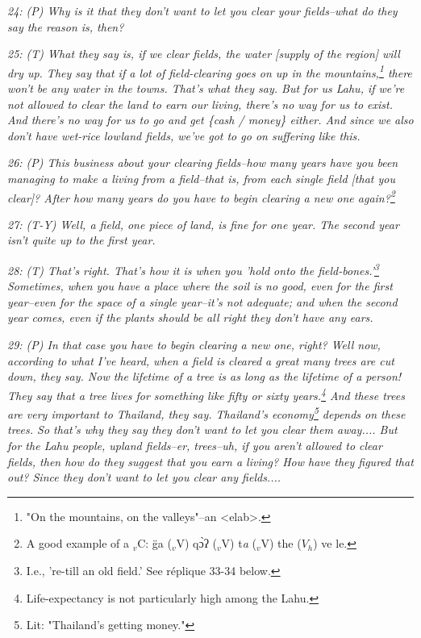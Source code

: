 \textit{24: (P) Why is it that they don't want to let you clear your fields--what
do they say the reason is, then?}

\textit{25: (T) What they say is, if we clear fields, the water [supply of the
region] will dry up. They say that if a lot of field-clearing goes on up in the
mountains,\footnote{"On the mountains, on the valleys"--an <elab>.} there won't be any water in the towns. That's what they say. But
for us Lahu, if we're not allowed to clear the land to earn our living, there's
no way for us to exist. And there's no way for us to go and get \{cash / money\}
either. And since we also don't have wet-rice lowland fields, we've got to go on
suffering like this. }

\textit{26: (P) This business about your clearing fields--how many years have you
been managing to make a living from a field--that is, from each single field [that
you clear]? After how many years do you have to begin clearing a new one again?\footnote{A good example of a $_{v}$C: g̈a ($_{v}$V) qɔ̀ʔ ($_{v}$V) t\emph{a} ($_{v}$V) the ($V_h$) ve le.}}

\textit{27: (T-Y) Well, a field, one piece of land, is fine for one year. The second
year isn't quite up to the first year. }

\textit{28: (T) That's right. That's how it is when you 'hold onto the field-bones.'\footnote{I.e., 're-till an old field.' See réplique 33-34 below.}
Sometimes, when you have a place where the soil is no good, even for the first
year--even for the space of a single year--it's not adequate; and when the second
year comes, even if the plants should be all right they don't have any ears. }

\textit{29: (P) In that case you have to begin clearing a new one, right? Well
now, according to what I've heard, when a field is cleared a great many trees are
cut down, they say. Now the lifetime of a tree is as long as the lifetime of a
person! They say that a tree lives for something like fifty or sixty years.\footnote{Life-expectancy is not particularly high among the Lahu.}
And these trees are very important to Thailand, they say. Thailand's economy\footnote{Lit: "Thailand's getting money."}
depends on these trees. So that's why they say they don't want to let you clear
them away.... But for the Lahu people, upland fields--er, trees--uh, if you aren't
allowed to clear fields, then how do they suggest that you earn a living? How have
they figured that out? Since they don't want to let you clear any fields.... }

